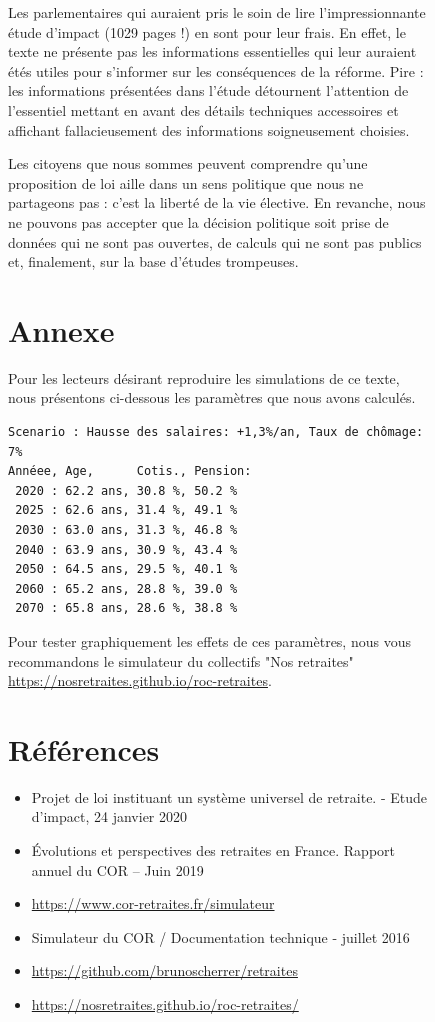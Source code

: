 \documentclass[10pt]{article}
\begin{document}
\begin{figure}
Les parlementaires qui auraient pris le soin de lire l'impressionnante 
étude d'impact (1029 pages !) en sont pour leur frais. 
En effet, le texte ne présente pas les informations essentielles qui leur auraient étés 
utiles pour s'informer sur les conséquences de la réforme. 
Pire : les informations présentées dans l'étude détournent l'attention de l'essentiel 
mettant en avant des détails techniques accessoires et affichant fallacieusement 
des informations soigneusement choisies. 

Les citoyens que nous sommes peuvent comprendre qu'une proposition de loi 
aille dans un sens politique que nous ne partageons pas : c'est la 
liberté de la vie élective. 
En revanche, nous ne pouvons pas accepter que la décision politique soit 
prise de données qui ne sont pas ouvertes, 
de calculs qui ne sont pas publics et, finalement, sur la base d'études trompeuses. 


\section{Annexe}

Pour les lecteurs désirant reproduire les simulations de ce texte, 
nous présentons ci-dessous les paramètres que nous avons calculés.
\begin{verbatim}
Scenario : Hausse des salaires: +1,3%/an, Taux de chômage: 7%
Annéee, Age,      Cotis., Pension:
 2020 : 62.2 ans, 30.8 %, 50.2 %
 2025 : 62.6 ans, 31.4 %, 49.1 %
 2030 : 63.0 ans, 31.3 %, 46.8 %
 2040 : 63.9 ans, 30.9 %, 43.4 %
 2050 : 64.5 ans, 29.5 %, 40.1 %
 2060 : 65.2 ans, 28.8 %, 39.0 %
 2070 : 65.8 ans, 28.6 %, 38.8 %
\end{verbatim}

Pour tester graphiquement les effets de ces paramètres, nous vous recommandons le 
simulateur du collectifs "Nos retraites" \url{https://nosretraites.github.io/roc-retraites}. 


\section{Références}

\begin{itemize}
\item Projet de loi instituant un système universel de retraite. - Etude d'impact, 24 janvier 2020
\item Évolutions et perspectives des retraites en France. Rapport annuel du COR – Juin 2019
\item \url{https://www.cor-retraites.fr/simulateur}
\item Simulateur du COR / Documentation technique - juillet 2016
\item \url{https://github.com/brunoscherrer/retraites}
\item \url{https://nosretraites.github.io/roc-retraites/}
\end{itemize}


\end{figure}
\end{document}

